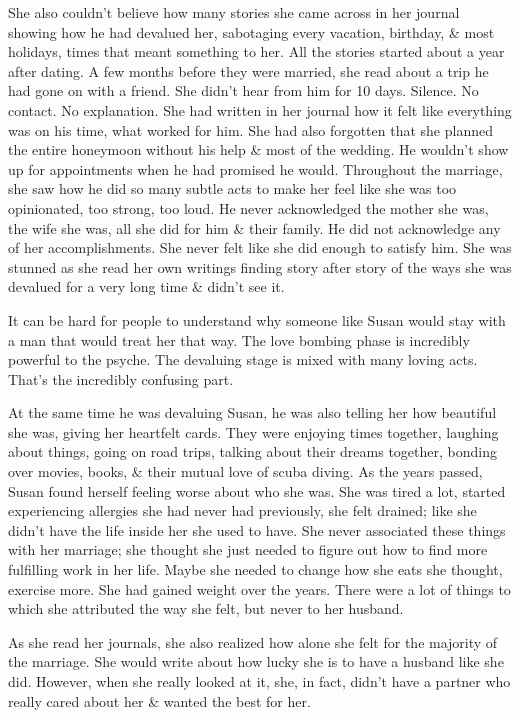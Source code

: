 \documentclass{article}
\numberwithin{equation}{section}
\begin{document}
She also couldn't believe how many stories she came across in her journal showing how he had devalued her, sabotaging every vacation, birthday, \& most holidays, times that meant something to her. All the stories started about a year after dating. A few months before they were married, she read about a trip he had gone on with a friend. She didn't hear from him for 10 days. Silence. No contact. No explanation. She had written in her journal how it felt like everything was on his time, what worked for him. She had also forgotten that she planned the entire honeymoon without his help \& most of the wedding. He wouldn't show up for appointments when he had promised he would. Throughout the marriage, she saw how he did so many subtle acts to make her feel like she was too opinionated, too strong, too loud. He never acknowledged the mother she was, the wife she was, all she did for him \& their family. He did not acknowledge any of her accomplishments. She never felt like she did enough to satisfy him. She was stunned as she read her own writings finding story after story of the ways she was devalued for a very long time \& didn't see it.

It can be hard for people to understand why someone like Susan would stay with a man that would treat her that way. The love bombing phase is incredibly powerful to the psyche. The devaluing stage is mixed with many loving acts. That's the incredibly confusing part.

At the same time he was devaluing Susan, he was also telling her how beautiful she was, giving her heartfelt cards. They were enjoying times together, laughing about things, going on road trips, talking about their dreams together, bonding over movies, books, \& their mutual love of scuba diving. As the years passed, Susan found herself feeling worse about who she was. She was tired a lot, started experiencing allergies she had never had previously, she felt drained; like she didn't have the life inside her she used to have. She never associated these things with her marriage; she thought she just needed to figure out how to find more fulfilling work in her life. Maybe she needed to change how she eats she thought, exercise more. She had gained weight over the years. There were a lot of things to which she attributed the way she felt, but never to her husband.

As she read her journals, she also realized how alone she felt for the majority of the marriage. She would write about how lucky she is to have a husband like she did. However, when she really looked at it, she, in fact, didn't have a partner who really cared about her \& wanted the best for her.
\end{document}
